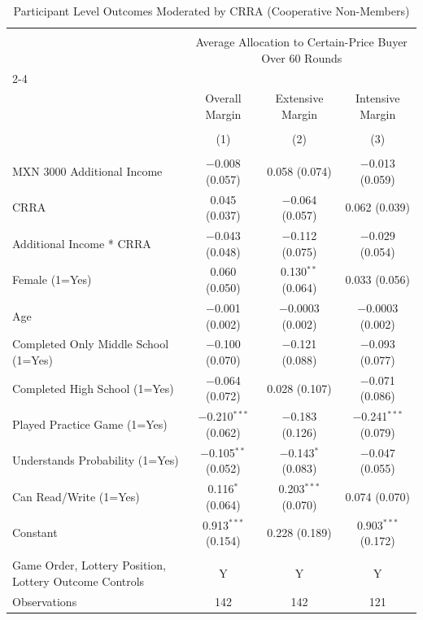 
\begin{table}[!htbp] \centering 
  \caption{Participant Level Outcomes Moderated by CRRA (Cooperative Non-Members)} 
  \label{participant_level_outcomes_crra_coop_no} 
\begin{tabular}{@{\extracolsep{5pt}}lccc} 
\\[-1.8ex]\hline 
\hline \\[-1.8ex] 
 & \multicolumn{3}{c}{Average Allocation to Certain-Price Buyer Over 60 Rounds} \\ 
\cline{2-4} 
\\[-1.8ex] & Overall Margin & Extensive Margin & Intensive Margin \\ 
\\[-1.8ex] & (1) & (2) & (3)\\ 
\hline \\[-1.8ex] 
 MXN 3000 Additional Income & $-$0.008 (0.057) & 0.058 (0.074) & $-$0.013 (0.059) \\ 
  CRRA & 0.045 (0.037) & $-$0.064 (0.057) & 0.062 (0.039) \\ 
  Additional Income * CRRA & $-$0.043 (0.048) & $-$0.112 (0.075) & $-$0.029 (0.054) \\ 
  Female (1=Yes) & 0.060 (0.050) & 0.130$^{**}$ (0.064) & 0.033 (0.056) \\ 
  Age & $-$0.001 (0.002) & $-$0.0003 (0.002) & $-$0.0003 (0.002) \\ 
  Completed Only Middle School (1=Yes) & $-$0.100 (0.070) & $-$0.121 (0.088) & $-$0.093 (0.077) \\ 
  Completed High School (1=Yes) & $-$0.064 (0.072) & 0.028 (0.107) & $-$0.071 (0.086) \\ 
  Played Practice Game (1=Yes) & $-$0.210$^{***}$ (0.062) & $-$0.183 (0.126) & $-$0.241$^{***}$ (0.079) \\ 
  Understands Probability (1=Yes) & $-$0.105$^{**}$ (0.052) & $-$0.143$^{*}$ (0.083) & $-$0.047 (0.055) \\ 
  Can Read/Write (1=Yes) & 0.116$^{*}$ (0.064) & 0.203$^{***}$ (0.070) & 0.074 (0.070) \\ 
  Constant & 0.913$^{***}$ (0.154) & 0.228 (0.189) & 0.903$^{***}$ (0.172) \\ 
 \hline \\[-1.8ex] 
Game Order, Lottery Position, Lottery Outcome Controls & Y & Y & Y \\ 
Observations & 142 & 142 & 121 \\ 

\end{tabular}
\end{table}

